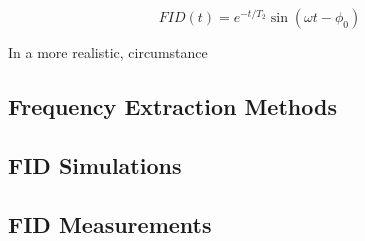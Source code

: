 \begin{equation}
\label{eqn:ideal-fid}
FID(t) = e^{-t/T_2} \sin(\omega t - \phi_0)
\end{equation}


In a more realistic, circumstance

\subsection{Frequency Extraction Methods}

\subsection{FID Simulations}

\subsection{FID Measurements}

